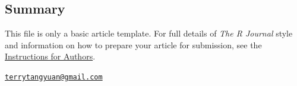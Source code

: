 \subsection{Summary}\label{summary}

This file is only a basic article template. For full details of
\emph{The R Journal} style and information on how to prepare your
article for submission, see the
\href{https://journal.r-project.org/share/author-guide.pdf}{Instructions
for Authors}. 

\address{%
Yuan Tang\\
H2O.ai\\
2309 Wake Robin Drive\\ West Lafayette, IN 47906\\
}
\href{mailto:terrytangyuan@gmail.com}{\nolinkurl{terrytangyuan@gmail.com}}

